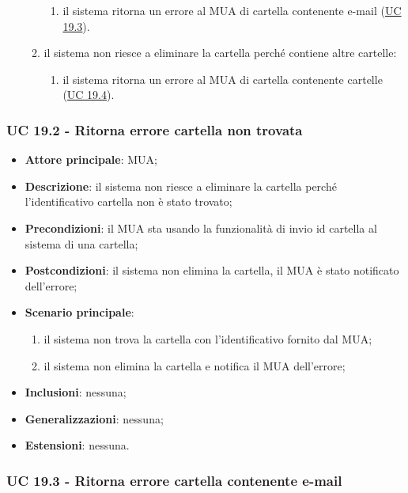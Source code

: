 \begin{itemize}
\begin{enumerate}[label=\alph*.]
\begin{enumerate}[label=\arabic*.]
                    \item il sistema ritorna un errore al MUA di cartella contenente e-mail (\hyperref[sec:UC19.3]{UC 19.3}).
                \end{enumerate}
                \item il sistema non riesce a eliminare la cartella perché contiene altre cartelle:
                \begin{enumerate}[label=\arabic*.]
                    \item il sistema ritorna un errore al MUA di cartella contenente cartelle (\hyperref[sec:UC19.4]{UC 19.4}).
                \end{enumerate}
            \end{enumerate}
    \end{itemize}


\subsubsection{UC 19.2 - Ritorna errore cartella non trovata} \label{sec:UC19.2}
    \begin{itemize}
        \item \textbf{Attore principale}: MUA;
        \item \textbf{Descrizione}: il sistema non riesce a eliminare la cartella perché l'identificativo cartella non è stato trovato;
        \item \textbf{Precondizioni}: il MUA sta usando la funzionalità di invio id cartella al sistema di una cartella;
        \item \textbf{Postcondizioni}: il sistema non elimina la cartella, il MUA è stato notificato dell'errore;
        \item \textbf{Scenario principale}:
            \begin{enumerate}
                \item il sistema non trova la cartella con l'identificativo fornito dal MUA;
                \item il sistema non elimina la cartella e notifica il MUA dell'errore;
            \end{enumerate}
        \item \textbf{Inclusioni}: nessuna;
        \item \textbf{Generalizzazioni}: nessuna;
        \item \textbf{Estensioni}: nessuna.
    \end{itemize}
   
    \subsubsection{UC 19.3 - Ritorna errore cartella contenente e-mail} \label{sec:UC19.3}

